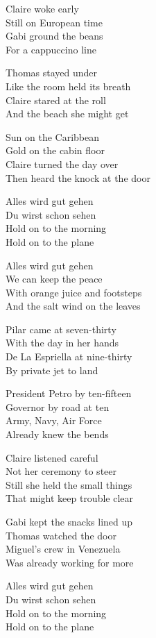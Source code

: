 \begin{lyrics}
Claire woke early\\
Still on European time\\
Gabi ground the beans\\
For a cappuccino line

Thomas stayed under\\
Like the room held its breath\\
Claire stared at the roll\\
And the beach she might get

Sun on the Caribbean\\
Gold on the cabin floor\\
Claire turned the day over\\
Then heard the knock at the door

Alles wird gut gehen\\
Du wirst schon sehen\\
Hold on to the morning\\
Hold on to the plane

Alles wird gut gehen\\
We can keep the peace\\
With orange juice and footsteps\\
And the salt wind on the leaves

Pilar came at seven-thirty\\
With the day in her hands\\
De La Espriella at nine-thirty\\
By private jet to land

President Petro by ten-fifteen\\
Governor by road at ten\\
Army, Navy, Air Force\\
Already knew the bends

Claire listened careful\\
Not her ceremony to steer\\
Still she held the small things\\
That might keep trouble clear

Gabi kept the snacks lined up\\
Thomas watched the door\\
Miguel’s crew in Venezuela\\
Was already working for more

Alles wird gut gehen\\
Du wirst schon sehen\\
Hold on to the morning\\
Hold on to the plane


\end{lyrics}
